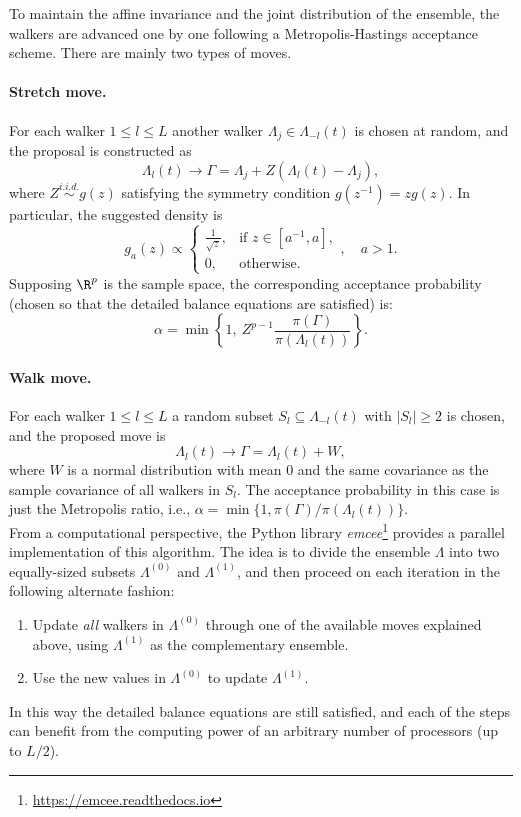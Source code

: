 To maintain the affine invariance and the joint distribution of the ensemble, the walkers are advanced one by one following a Metropolis-Hastings acceptance scheme. There are mainly two types of moves.

  \paragraph{Stretch move.} For each walker \(1\leq l \leq L\) another walker \(\Lambda_j \in \Lambda_{-l}(t)\) is chosen at random, and the proposal is constructed as
  \[
    \Lambda_l(t) \to \Gamma = \Lambda_j + Z(\Lambda_l(t) - \Lambda_j),
  \]
  where \(Z \stackrel{i.i.d.}{\sim} g(z)\) satisfying the symmetry condition \(g(z^{-1})=zg(z)\). In particular, the suggested density is
  \[
  g_a(z) \propto \begin{cases}
    \frac{1}{\sqrt{z}}, & \text{if } z \in [a^{-1}, a],\\
    0, & \text{otherwise.}
\end{cases}, \quad a > 1.
  \]
Supposing \(\R^p\) is the sample space, the corresponding acceptance probability (chosen so that the detailed balance equations are satisfied) is:
  \[
    \alpha = \min\left\{1, \ Z^{p-1}\frac{\pi(\Gamma)}{\pi(\Lambda_l(t))}\right\}.
  \]

  \paragraph{Walk move.} For each walker \(1\leq l \leq L\) a random subset \(S_l \subseteq \Lambda_{-l}(t)\) with \(|S_l| \geq 2\) is chosen, and the proposed move is
\[
\Lambda_l(t) \to \Gamma = \Lambda_l(t) + W,
\]
where \(W\) is a normal distribution with mean \(0\) and the same covariance as the sample covariance of all walkers in \(S_l\). The acceptance probability in this case is just the Metropolis ratio, i.e., \(\alpha=\min\{1, \pi(\Gamma)/\pi(\Lambda_l(t))\}\).\\

From a computational perspective, the Python library \textit{emcee}\footnote{\url{https://emcee.readthedocs.io}} \citep{foreman2013emcee} provides a parallel implementation of this algorithm. The idea is to divide the ensemble \(\Lambda\) into two equally-sized subsets \(\Lambda^{(0)}\) and \(\Lambda^{(1)}\), and then proceed on each iteration in the following alternate fashion:

\begin{enumerate}[1.]
  \item Update \textit{all} walkers in \(\Lambda^{(0)}\) through one of the available moves explained above, using \(\Lambda^{(1)}\) as the complementary ensemble.
  \item Use the new values in \(\Lambda^{(0)}\) to update \(\Lambda^{(1)}\).
\end{enumerate}

In this way the detailed balance equations are still satisfied, and each of the steps can benefit from the computing power of an arbitrary number of processors (up to \(L/2\)).
